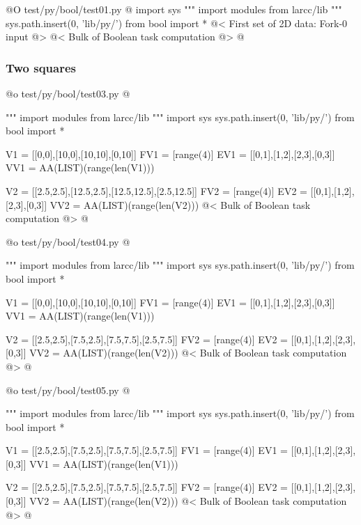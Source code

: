 \documentclass[11pt,oneside]{article}	%
\begin{document}
@O test/py/bool/test01.py
@{
import sys
""" import modules from larcc/lib """
sys.path.insert(0, 'lib/py/')
from bool import *
@< First set of 2D data: Fork-0 input @>
@< Bulk of Boolean task computation @>
@}


\subsubsection{Two squares}




@o test/py/bool/test03.py
@{""" import modules from larcc/lib """
import sys
sys.path.insert(0, 'lib/py/')
from bool import *

V1 = [[0,0],[10,0],[10,10],[0,10]]
FV1 = [range(4)]
EV1 = [[0,1],[1,2],[2,3],[0,3]]
VV1 = AA(LIST)(range(len(V1)))

V2 = [[2.5,2.5],[12.5,2.5],[12.5,12.5],[2.5,12.5]]
FV2 = [range(4)]
EV2 = [[0,1],[1,2],[2,3],[0,3]]
VV2 = AA(LIST)(range(len(V2)))
@< Bulk of Boolean task computation @>
@}


@o test/py/bool/test04.py
@{""" import modules from larcc/lib """
import sys
sys.path.insert(0, 'lib/py/')
from bool import *

V1 = [[0,0],[10,0],[10,10],[0,10]]
FV1 = [range(4)]
EV1 = [[0,1],[1,2],[2,3],[0,3]]
VV1 = AA(LIST)(range(len(V1)))

V2 = [[2.5,2.5],[7.5,2.5],[7.5,7.5],[2.5,7.5]]
FV2 = [range(4)]
EV2 = [[0,1],[1,2],[2,3],[0,3]]
VV2 = AA(LIST)(range(len(V2)))
@< Bulk of Boolean task computation @>
@}

@o test/py/bool/test05.py
@{""" import modules from larcc/lib """
import sys
sys.path.insert(0, 'lib/py/')
from bool import *

V1 = [[2.5,2.5],[7.5,2.5],[7.5,7.5],[2.5,7.5]]
FV1 = [range(4)]
EV1 = [[0,1],[1,2],[2,3],[0,3]]
VV1 = AA(LIST)(range(len(V1)))

V2 = [[2.5,2.5],[7.5,2.5],[7.5,7.5],[2.5,7.5]]
FV2 = [range(4)]
EV2 = [[0,1],[1,2],[2,3],[0,3]]
VV2 = AA(LIST)(range(len(V2)))
@< Bulk of Boolean task computation @>
@}
\end{document}

